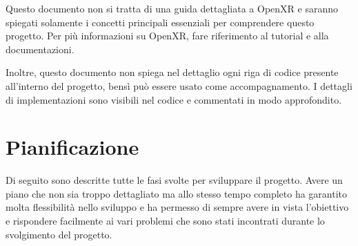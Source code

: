 \documentclass[twoside]{supsistudent}
\begin{document}
Questo documento non si tratta di una guida dettagliata a OpenXR e saranno spiegati solamente i concetti principali essenziali per comprendere questo progetto. Per più informazioni su OpenXR, fare riferimento al tutorial e alla documentazioni.

Inoltre, questo documento non spiega nel dettaglio ogni riga di codice presente all'interno del progetto, bensì può essere usato come accompagnamento. I dettagli di implementazioni sono visibili nel codice e commentati in modo approfondito.


\section{Pianificazione}

Di seguito sono descritte tutte le fasi svolte per sviluppare il progetto. Avere un piano che non sia troppo dettagliato ma allo stesso tempo completo ha garantito molta flessibilità nello sviluppo e ha permesso di sempre avere in vista l'obiettivo e rispondere facilmente ai vari problemi che sono stati incontrati durante lo svolgimento del progetto.

\end{document}
